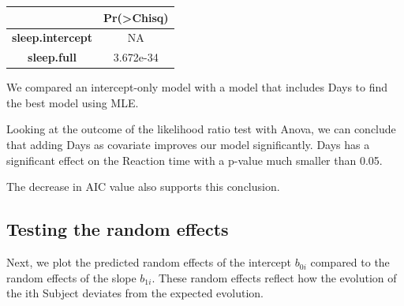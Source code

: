 \documentclass[
]{article}
\begin{document}
\begin{longtable}[]{@{}cc@{}}
\toprule
\begin{minipage}[b]{0.29\columnwidth}\centering
~\strut
\end{minipage} & \begin{minipage}[b]{0.17\columnwidth}\centering
Pr(\textgreater Chisq)\strut
\end{minipage}\tabularnewline
\midrule
\endhead
\begin{minipage}[t]{0.29\columnwidth}\centering
\textbf{sleep.intercept}\strut
\end{minipage} & \begin{minipage}[t]{0.17\columnwidth}\centering
NA\strut
\end{minipage}\tabularnewline
\begin{minipage}[t]{0.29\columnwidth}\centering
\textbf{sleep.full}\strut
\end{minipage} & \begin{minipage}[t]{0.17\columnwidth}\centering
3.672e-34\strut
\end{minipage}\tabularnewline
\bottomrule
\end{longtable}


We compared an intercept-only model with a model that includes Days to
find the best model using MLE.

Looking at the outcome of the likelihood ratio test with Anova, we can
conclude that adding Days as covariate improves our model significantly.
Days has a significant effect on the Reaction time with a p-value much
smaller than 0.05.

The decrease in AIC value also supports this conclusion.

\pagebreak

\hypertarget{testing-the-random-effects}{%
\subsection{Testing the random
effects}\label{testing-the-random-effects}}

Next, we plot the predicted random effects of the intercept \(b_{0i}\)
compared to the random effects of the slope \(b_{1i}\). These random
effects reflect how the evolution of the ith Subject deviates from the
expected evolution.
\end{document}
